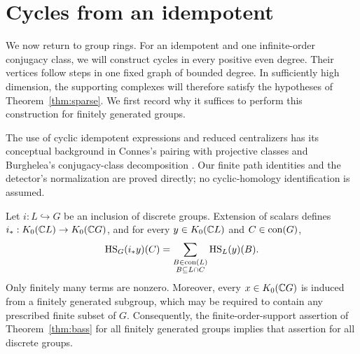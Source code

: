 \section{Cycles from an idempotent}
\label{sec:idempotents}

We now return to group rings.  For an idempotent and one infinite-order
conjugacy class, we will construct cycles in every positive even degree.
Their vertices follow steps in one fixed graph of bounded degree. In
sufficiently high dimension, the supporting complexes will therefore
satisfy the hypotheses of Theorem~\ref{thm:sparse}. We first record why
it suffices to perform this construction for finitely generated groups.

The use of cyclic idempotent expressions and reduced centralizers has
its conceptual background in Connes's pairing with projective classes
\cite[Part II, Section 2, Proposition 14]{Connes1985} and Burghelea's
conjugacy-class decomposition \cite[Theorem I]{Burghelea1985}. Our finite
path identities and the detector's normalization are proved directly;
no cyclic-homology identification is assumed.

\begin{lemma}\label{lem:locality}
Let $i:L\hookrightarrow G$ be an inclusion of discrete groups.  Extension
of scalars defines $i_*:K_0(\mathbb C L)\to K_0(\mathbb C G)$, and for every
$y\in K_0(\mathbb C L)$ and $C\in\operatorname{con}(G)$,
\begin{equation}\label{eq:class-aggregation}
 \operatorname{HS}_G(i_*y)(C)
 =\sum_{\substack{B\in\operatorname{con}(L)\\ B\subseteq L\cap C}}
       \operatorname{HS}_L(y)(B).
\end{equation}
Only finitely many terms are nonzero.  Moreover, every
$x\in K_0(\mathbb C G)$ is induced from a finitely generated subgroup, which may
be required to contain any prescribed finite subset of $G$.
Consequently, the finite-order-support assertion of
Theorem~\ref{thm:bass} for all finitely generated groups implies that
assertion for all discrete groups.
\end{lemma}

